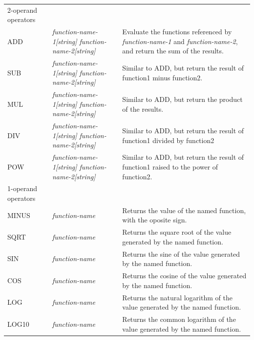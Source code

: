 \documentclass[a4paper,11pt]{report}
\begin{document}
\begin{center}
\begin{longtable}{|p{2.25cm} | p{4cm} p{9.5cm}|}
  \hline
  \rowcolor{blue!15}
  2-operand operators & & \\*

  ADD        & \emph{function-name-1[string] function-name-2[string]} &
  Evaluate the functions referenced by \emph{function-name-1} and \emph{function-name-2}, and return the sum of the results.\\*

  SUB        & \emph{function-name-1[string] function-name-2[string]} &
  Similar to ADD, but return the result of function1 minus function2.\\*
  
  MUL        & \emph{function-name-1[string] function-name-2[string]} & 
  Similar to ADD, but return the product of the results. \\*

  DIV        & \emph{function-name-1[string] function-name-2[string]} & 
  Similar to ADD, but return the result of function1 divided by function2\\*
  
  POW        & \emph{function-name-1[string] function-name-2[string]} & 
  Similar to ADD, but return the result of function1 raised to the power of function2.\\
  
  \hline
  \rowcolor{blue!15}
  1-operand operators & & \\*

  MINUS      & \emph{function-name} &
  Returns the value of the named function, with the oposite sign. \\*

  SQRT       & \emph{function-name} & 
  Returns the square root of the value generated by the named function. \\*
  
  SIN        & \emph{function-name} & 
  Returns the sine of the value generated by the named function. \\*
  
  COS        & \emph{function-name} &
  Returns the cosine of the value generated by the named function. \\*
  
  LOG        & \emph{function-name} &
  Returns the natural logarithm of the value generated by the named function. \\*
  
  LOG10      & \emph{function-name} &
  Returns the common logarithm of the value generated by the named function. \\*
  

\end{longtable}
\end{center}
\end{document}

